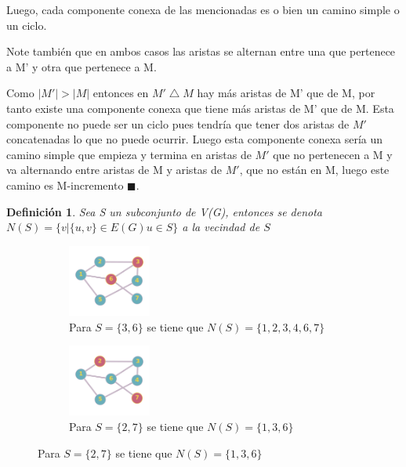 \documentclass[a4paper,1pt]{report}
\newtheorem*{dfn}{Definición}
\begin{document}
Luego, cada componente conexa de las mencionadas es o bien un camino simple o un ciclo. 

Note también que en ambos casos las aristas se alternan entre una que pertenece a M' y otra que pertenece a M.

Como $|M'|>|M|$ entonces en $M'\bigtriangleup M$ hay más aristas de M' que de M, por tanto existe una componente conexa que tiene más aristas de M' que de M. Esta componente no puede ser un ciclo pues tendría que tener dos aristas de $M'$ concatenadas lo que no puede ocurrir. Luego esta componente conexa sería un camino simple que empieza y termina en aristas de $M'$ que no pertenecen a M y va alternando entre aristas de M y aristas de $M'$, que no están en M, luego este camino es M-incremento $\blacksquare$.

\begin{dfn}
 Sea S un subconjunto de V(G), entonces se denota $N(S)=\{v|\{u,v\} \in E(G) u\in S\}$ a la vecindad de $S$
\end{dfn}

\begin{figure}[H]
    \centering
    \begin{subfigure}[b]{0.70\textwidth}
        \centering
        \includegraphics[width=0.3\textwidth]{figures7/vecindario.png}
        \caption{Para $S = \{3,6\}$ se tiene que $N(S) = \{1,2,3,4,6,7\}$}
    \end{subfigure} 
    \begin{subfigure}[b]{0.70\textwidth}
        \centering
        \includegraphics[width=0.3\textwidth]{figures7/vecindario2.png}
        \caption{Para $S = \{2,7\}$ se tiene que $N(S) = \{1,3,6\}$}
    \end{subfigure}
\end{figure} 
\end{document}

